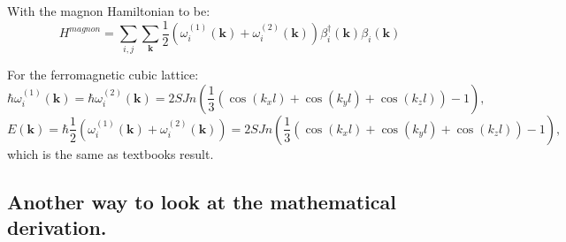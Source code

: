 \documentclass[a4paper,12pt]{article}
\begin{document}
            With the magnon Hamiltonian to be:
            \begin{equation}
                H^{magnon} = \sum_{i,j}\sum_{\boldsymbol{k}}\dfrac{1}{2}(\omega_i^{(1)}(\boldsymbol{k}) + \omega_i^{(2)}(\boldsymbol{k}))
                \beta^{\dag}_i(\boldsymbol{k})\beta_i(\boldsymbol{k})
            \end{equation}

            For the ferromagnetic cubic lattice:
            \begin{equation}
                \hbar \omega_i^{(1)}(\boldsymbol{k}) =
                \hbar \omega_i^{(2)}(\boldsymbol{k}) = 
                2SJn\left(\dfrac{1}{3}\left(\cos(k_xl) + \cos(k_yl) + \cos(k_zl)\right) - 1\right),
            \end{equation}
            \begin{equation}
                E(\boldsymbol{k}) = 
                \hbar \dfrac{1}{2}(\omega_i^{(1)}(\boldsymbol{k}) +
                \omega_i^{(2)}(\boldsymbol{k})) = 
                2SJn\left(\dfrac{1}{3}\left(\cos(k_xl) + \cos(k_yl) + \cos(k_zl)\right) - 1\right),
            \end{equation}
            which is the same as textbooks result.

        \subsection{Another way to look at the mathematical derivation.}
\end{document}
